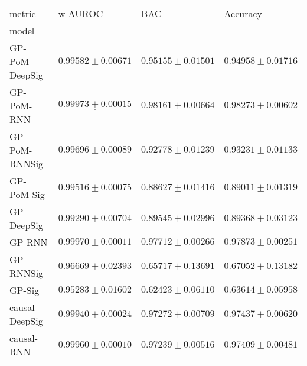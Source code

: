 \begin{tabular}{llll}
\toprule
metric &                                           w-AUROC &                                               BAC &                                          Accuracy \\
model          &                                                   &                                                   &                                                   \\
\midrule
GP-PoM-DeepSig &                           $ 0.99582 \pm 0.00671 $ &                           $ 0.95155 \pm 0.01501 $ &                           $ 0.94958 \pm 0.01716 $ \\
GP-PoM-RNN     &            $  \underline{ 0.99973 \pm 0.00015 } $ &               $  \mathbf{ 0.98161 \pm 0.00664 } $ &               $  \mathbf{ 0.98273 \pm 0.00602 } $ \\
GP-PoM-RNNSig  &                           $ 0.99696 \pm 0.00089 $ &                           $ 0.92778 \pm 0.01239 $ &                           $ 0.93231 \pm 0.01133 $ \\
GP-PoM-Sig     &                           $ 0.99516 \pm 0.00075 $ &                           $ 0.88627 \pm 0.01416 $ &                           $ 0.89011 \pm 0.01319 $ \\
GP-DeepSig     &                           $ 0.99290 \pm 0.00704 $ &                           $ 0.89545 \pm 0.02996 $ &                           $ 0.89368 \pm 0.03123 $ \\
GP-RNN         &                           $ 0.99970 \pm 0.00011 $ &                           $ 0.97712 \pm 0.00266 $ &                           $ 0.97873 \pm 0.00251 $ \\
GP-RNNSig      &                           $ 0.96669 \pm 0.02393 $ &                           $ 0.65717 \pm 0.13691 $ &                           $ 0.67052 \pm 0.13182 $ \\
GP-Sig         &                           $ 0.95283 \pm 0.01602 $ &                           $ 0.62423 \pm 0.06110 $ &                           $ 0.63614 \pm 0.05958 $ \\
causal-DeepSig &                           $ 0.99940 \pm 0.00024 $ &                           $ 0.97272 \pm 0.00709 $ &                           $ 0.97437 \pm 0.00620 $ \\
causal-RNN     &                           $ 0.99960 \pm 0.00010 $ &                           $ 0.97239 \pm 0.00516 $ &                           $ 0.97409 \pm 0.00481 $ \\

\end{tabular}
